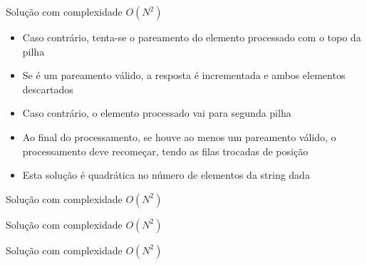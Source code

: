 \begin{frame}[fragile]{Solução com complexidade $O(N^2)$}

    \begin{itemize}
        \item Caso contrário, tenta-se o pareamento do elemento processado com o topo da 
            pilha

        \item Se é um pareamento válido, a resposta é incrementada e ambos elementos descartados

        \item Caso contrário, o elemento processado vai para segunda pilha

        \item Ao final do processamento, se houve ao menos um pareamento válido, o processamento
            deve recomeçar, tendo as filas trocadas de posição

        \item Esta solução é quadrática no número de elementos da string dada
   \end{itemize}

\end{frame}

\begin{frame}[fragile]{Solução com complexidade $O(N^2)$}
\end{frame}

\begin{frame}[fragile]{Solução com complexidade $O(N^2)$}
\end{frame}

\begin{frame}[fragile]{Solução com complexidade $O(N^2)$}
\end{frame}
